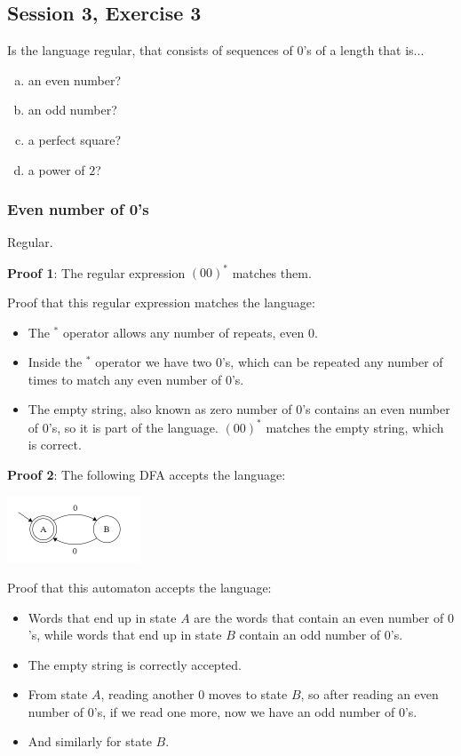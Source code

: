 \subsection{Session 3, Exercise 3}


Is the language regular, that consists of sequences of $0$'s of a length that is...
\begin{enumerate}[a.)]
\item an even number?
\item an odd number?
\item a perfect square?
\item a power of $2$?
\end{enumerate}


\subsubsection{Even number of 0's}

Regular.

\textbf{Proof 1}: The regular expression $(00)^*$ matches them.

Proof that this regular expression matches the language:

\begin{itemize}
    \item The $^*$ operator allows any number of repeats, even 0.
    \item Inside the $^*$ operator we have two $0$'s, which can be repeated any number of times to match any even number of $0$'s.
    \item The empty string, also known as zero number of $0$'s contains an even number of $0$'s, so it is part of the language. $(00)^*$ matches the empty string, which is correct.
\end{itemize}

\textbf{Proof 2}: The following DFA accepts the language:

\includegraphics[width=150px]{03/even_zeroes.png}

Proof that this automaton accepts the language:

\begin{itemize}
    \item Words that end up in state $A$ are the words that contain an even number of $0$'s, while words that end up in state $B$ contain an odd number of $0$'s.
    \item The empty string is correctly accepted.
    \item From state $A$, reading another $0$ moves to state $B$, so after reading an even number of $0$'s, if we read one more, now we have an odd number of $0$'s.
    \item And similarly for state $B$.
\end{itemize}

